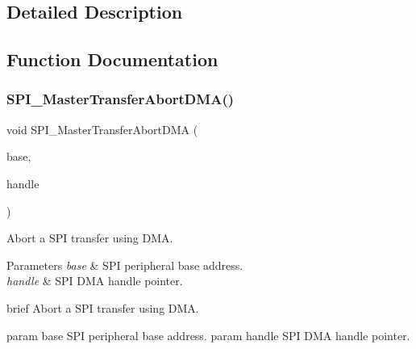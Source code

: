 \subsection{Detailed Description}


\subsection{Function Documentation}
\mbox{\label{group__spi__dma__driver_gac5f2aabca472a57709db2ef153e031c8}} 
\subsubsection{\texorpdfstring{SPI\_MasterTransferAbortDMA()}{SPI\_MasterTransferAbortDMA()}}
{\footnotesize\ttfamily void S\+P\+I\+\_\+\+Master\+Transfer\+Abort\+D\+MA (\begin{DoxyParamCaption}\item[{\mbox{\hyperlink{struct_s_p_i___type}{S\+P\+I\+\_\+\+Type}} $\ast$}]{base,  }\item[{\mbox{\hyperlink{struct__spi__dma__handle}{spi\+\_\+dma\+\_\+handle\+\_\+t}} $\ast$}]{handle }\end{DoxyParamCaption})}



Abort a S\+PI transfer using D\+MA. 


\begin{DoxyParams}{Parameters}
{\em base} & S\+PI peripheral base address. \\
\hline
{\em handle} & S\+PI D\+MA handle pointer.\\
\hline
\end{DoxyParams}
brief Abort a S\+PI transfer using D\+MA.

param base S\+PI peripheral base address. param handle S\+PI D\+MA handle pointer. \mbox{\label{group__spi__dma__driver_ga5e1c842943c46c7daf3d6ecd99fe8681}} 
